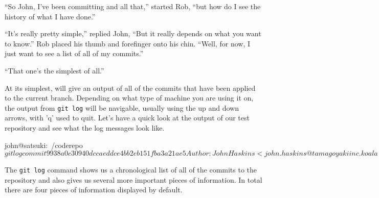 \begin{trenches}
``So John, I've been committing and all that,'' started Rob, ``but how do I see the history of what I have done.''

``It's really pretty simple,'' replied John, ``But it really depends on what you want to know.''
Rob placed his thumb and forefinger onto his chin.  ``Well, for now, I just want to see a list of all of my commits.''

``That one's the simplest of all.''
\end{trenches}

At its simplest,  will give an output of all of the commits that have been applied to the current branch.  Depending on what type of machine you are using it on, the output from \texttt{git log} will be navigable, usually using the up and down arrows, with 'q' used to quit.  Let's have a quick look at the output of our test repository and see what the log messages look like.

\begin{code}
john@satsuki:~/coderepo$ git log
commit 9938a0c30940dccaeddce4bb2eb151fba3a21ae5
Author: John Haskins <john.haskins@tamagoyakiinc.koala>
Date:   Thu Mar 31 20:34:23 2011 +0100

    Finished adding initial files

commit 163f06147a449e724d0cfd484c3334709e8e1fce
Author: John Haskins <john.haskins@tamagoyakiinc.koala>
Date:   Thu Mar 31 20:32:59 2011 +0100

    Made a few changes to first and second files

commit cfe23cbe0150fda69a004e301828097935ec4397
Author: John Haskins <john.haskins@tamagoyakiinc.koala>
Date:   Thu Mar 31 20:27:44 2011 +0100

    My First Ever Commit
john@satsuki:~/coderepo$ 

\end{code}

The \texttt{git log} command shows us a chronological list of all of the commits to the repository and also gives us several more important pieces of information.  In total there are four pieces of information displayed by default.

